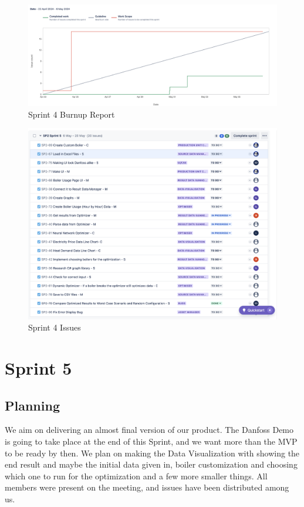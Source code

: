 \documentclass[12pt]{report}
\begin{document}
\begin{figure}[H]
  \centering
  \includegraphics[width=1\textwidth]{Resources/4-Sprint/Review/Burndown.png}
  \caption{Sprint 4 Burnup Report}
  \label{fig:S4Burndown-image}
\end{figure}

\begin{figure}[H]
  \centering
  \includegraphics[width=1\textwidth]{Resources/4-Sprint/Review/Issues.png}
  \caption{Sprint 4 Issues}
  \label{fig:S4Issues-image}
\end{figure}
\clearpage







\section {Sprint 5}
\subsection*{Planning}
We aim on delivering an almost final version of our product. The Danfoss Demo is going to take place at the end of this Sprint, and we want more than the MVP to be ready by then. We plan on making the Data Visualization with showing the end result and maybe the initial data given in, boiler customization and choosing which one to run for the optimization and a few more smaller things. All members were present on the meeting, and issues have been distributed among us.
\end{document}
